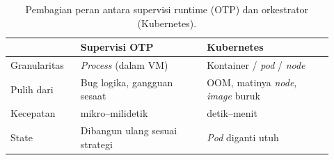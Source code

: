 \begin{table}[H]
  \centering\small
  \begin{tabular}{@{}p{0.20\linewidth}p{0.36\linewidth}p{0.36\linewidth}@{}}
    \toprule
    & \textbf{Supervisi OTP} & \textbf{Kubernetes} \\
    \midrule
    Granularitas & \emph{Process} (dalam VM) & Kontainer / \emph{pod} / \emph{node} \\
    Pulih dari & Bug logika, gangguan sesaat & OOM, matinya \emph{node}, \emph{image} buruk \\
    Kecepatan & mikro--milidetik & detik--menit \\
    State & Dibangun ulang sesuai strategi & \emph{Pod} diganti utuh \\
    \bottomrule
  \end{tabular}
  \caption{Pembagian peran antara supervisi runtime (OTP) dan orkestrator (Kubernetes).}
  \label{tab:overlap}
\end{table}
